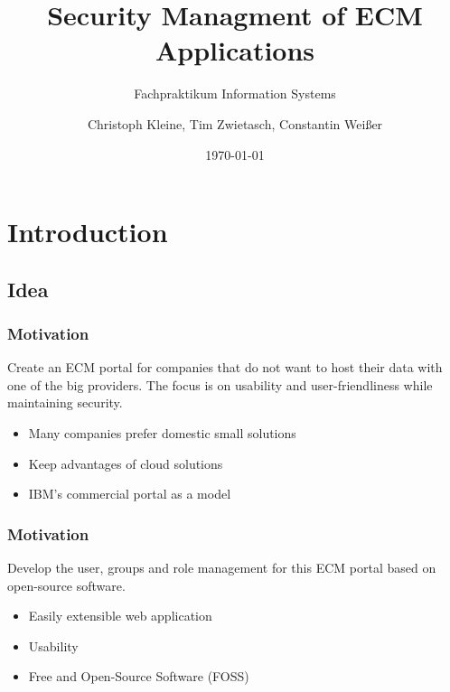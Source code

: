 \documentclass{beamer}
\title{Security Managment of ECM Applications}
\subtitle{Fachpraktikum Information Systems}
\author{Christoph Kleine, Tim Zwietasch, Constantin Weißer}
\date{\today}
\begin{document}


\lstset{style=customc}



\frame{\titlepage}

\section{Introduction}
\subsection{Idea}
\begin{frame}
	\frametitle{Motivation}
	\begin{tcolorbox}[title=Overall Goal]
		Create an ECM portal for companies that do not want to host
		their data with one of the big providers. The focus is on
		usability and user-friendliness while maintaining security.
	\end{tcolorbox}

	\begin{itemize}
		\item Many companies prefer domestic small solutions
		\item Keep advantages of cloud solutions
		\item IBM's commercial portal as a model
	\end{itemize}
\end{frame}

\begin{frame}
	\frametitle{Motivation}
	\begin{tcolorbox}[title=Our Goal]
		Develop the user, groups and role management for this ECM portal
		based on open-source software.
	\end{tcolorbox}
	\begin{itemize}
		\item Easily extensible web application
		\item Usability
		\item Free and Open-Source Software (FOSS)
	\end{itemize}
\end{frame}
\end{document}
